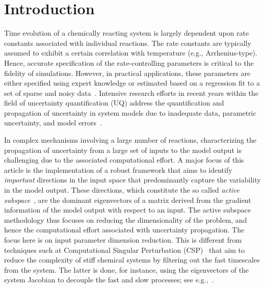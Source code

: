 \section{Introduction}
\label{sec:intro}


Time evolution of a chemically reacting system is largely dependent upon rate
constants associated with individual reactions. The rate constants are
typically assumed to exhibit a certain correlation with temperature (e.g.,
Arrhenius-type). Hence, accurate specification of the rate-controlling
parameters is critical to the fidelity of simulations. However, in practical
applications, these parameters are either specified using expert knowledge or
estimated based on a regression fit to a set of sparse and noisy
data~\cite{Burnham:1987, Burnham:1988, Vohra:2011, Sarathy:2012}.
Intensive research efforts in recent years within the field of uncertainty quantification (UQ)
address the quantification and propagation of uncertainty in system models due to 
inadequate data, parametric uncertainty, and model errors~\cite{Vohra:2014, 
Vohra:2017, Morrison:2018, Hantouche:2018, Nannapaneni:2016, Sankararaman:2015,
Reagana:2003}. 

In complex mechanisms involving a large number of reactions, characterizing the
propagation of uncertainty from a large set of inputs to the model output is
challenging due to the associated computational effort.  A major focus of this
article is the implementation of a robust framework that aims to identify
\emph{important} directions in the input space that predominantly capture the
variability in the model output. These directions, which constitute the so called
\emph{active subspace}~\cite{Constantine:2015}, are the dominant eigenvectors
of a matrix derived from the gradient information of the model output with
respect to an input. The active subspace methodology thus focuses on reducing
the dimensionality of the problem, and hence the computational effort
associated with uncertainty propagation. The focus here is on input parameter
dimension reduction. This is different from 
techniques such at Computational
Singular Perturbation (CSP)~\cite{Lam85,
LamGoussis89,ValoraniCretaGoussisEtAl06,
DebusschereMarzoukNajmEtAl12,
SalloumAlexanderianLeMaitreEtAl12} that aim to reduce the
complexity of stiff chemical systems by filtering out the 
fast timescales from the system. The latter is done, for instance, using
the eigenvectors of the system Jacobian 
to decouple the fast and slow processes; see e.g.,~\cite{DebusschereMarzoukNajmEtAl12}.

